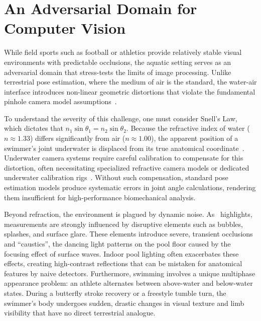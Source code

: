 \section{An Adversarial Domain for Computer Vision}
While field sports such as football or athletics provide relatively stable visual environments
with predictable occlusions, the aquatic setting serves as an adversarial domain that
stress-tests the limits of image processing. Unlike terrestrial pose estimation, where the
medium of air is the standard, the water-air interface introduces non-linear geometric
distortions that violate the fundamental pinhole camera model
assumptions~\cite{agrawal2012theory}.

To understand the severity of this challenge, one must consider Snell's Law, which dictates that
$n_1 \sin \theta_1 = n_2 \sin \theta_2$. Because the refractive index of water ($n \approx
    1.33$) differs significantly from air ($n \approx 1.00$), the apparent position of a swimmer's
joint underwater is displaced from its true anatomical
coordinate~\cite{harvey1998calibration}. Underwater camera systems require careful calibration
to compensate for this distortion, often necessitating specialized refractive camera models or
dedicated underwater calibration rigs~\cite{shortis2015calibration}. Without such compensation,
standard pose estimation models produce systematic errors in joint angle calculations, rendering
them insufficient for high-performance biomechanical analysis.

Beyond refraction, the environment is plagued by dynamic noise. As~\cite{giulietti_swimmernet_2023}
highlights, measurements are strongly influenced by disruptive elements such as bubbles, splashes,
and surface glare. These elements introduce severe, transient occlusions and
``caustics'', the dancing light patterns on the pool floor caused by the focusing effect of
surface waves. Indoor pool lighting often exacerbates these effects, creating high-contrast
reflections that can be mistaken for anatomical features by naive detectors. Furthermore,
swimming involves a unique multiphase appearance problem: an athlete alternates between
above-water and below-water states. During a butterfly stroke recovery or a freestyle tumble
turn, the swimmer's body undergoes sudden, drastic changes in visual texture and limb visibility
that have no direct terrestrial analogue.

